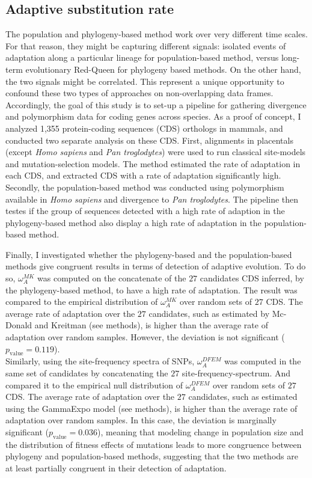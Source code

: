 \subsection{Adaptive \gls{substitution} rate}
The population and phylogeny-based method work over very different time scales.
For that reason, they might be capturing different signals: isolated events of adaptation along a particular lineage for population-based method, versus long-term evolutionary Red-Queen for phylogeny based methods. On the other hand, the two signals might be correlated. This represent a unique opportunity to confound these two types of approaches on non-overlapping data frames. Accordingly, the goal of this study is to set-up a pipeline for gathering divergence and polymorphism data for coding genes across species. As a proof of concept, I analyzed 1,355 protein-coding sequences (CDS) orthologs in mammals, and conducted two separate analysis on these CDS. First, alignments in placentals (except \textit{Homo sapiens} and \textit{Pan troglodytes}) were used to run classical site-models and mutation-selection models. The method estimated the rate of adaptation in each CDS, and extracted CDS with a rate of adaptation significantly high. Secondly, the population-based method was conducted using polymorphism available in \textit{Homo sapiens} and divergence to \textit{Pan troglodytes}. The pipeline then testes if the group of sequences detected with a high rate of adaption in the phylogeny-based method also display a high rate of adaptation in the population-based method.

Finally, I investigated whether the phylogeny-based and the population-based methods give congruent results in terms of detection of adaptive evolution. 
To do so, $\omega_A^{MK}$ was computed on the concatenate of the $27$ candidates CDS inferred, by the phylogeny-based method, to have a high rate of adaptation. The result was compared to the empirical distribution of $\omega_A^{MK}$ over random sets of $27$ CDS.
The average rate of adaptation over the $27$ candidates, such as estimated by Mc-Donald and Kreitman (see methods), is higher than the average rate of adaptation over random samples. However, the deviation is not significant ($p_{\mathrm{value}}=0.119$).\\

Similarly, using the site-frequency spectra of SNPs, $\omega_A^{DFEM}$ was computed in the same set of candidates by concatenating the $27$ site-frequency-spectrum. And compared it to the empirical null distribution of $\omega_A^{DFEM}$ over random sets of $27$ CDS.
The average rate of adaptation over the $27$ candidates, such as estimated using the GammaExpo model (see methods), is higher than the average rate of adaptation over random samples. In this case, the deviation is marginally significant ($p_{\mathrm{value}}=0.036$), 
meaning that modeling change in population size and the distribution of fitness effects of mutations leads to more congruence between phylogeny and population-based methods, suggesting that the two methods are at least partially congruent in their detection of adaptation.

